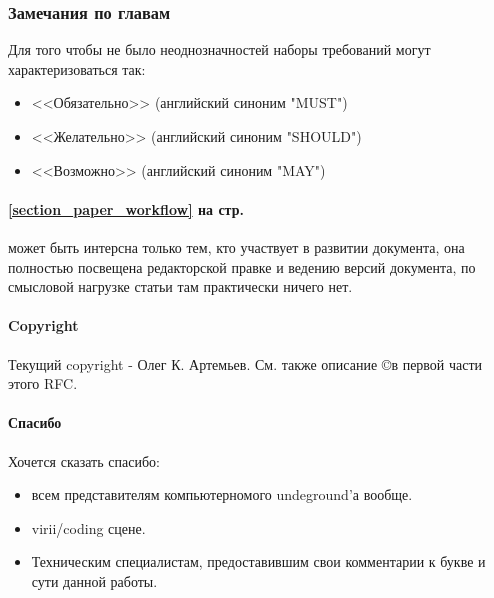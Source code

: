 \subsubsection{Замечания по главам}

Для того чтобы не было неоднозначностей наборы требований
могут характеризоваться так:

\begin{itemize}
\item{ <<Обязательно>> (английский синоним "MUST")}
\item{ <<Желательно>>  (английский синоним "SHOULD")}
\item{ <<Возможно>>    (английский синоним "MAY")}
\end{itemize}

\paragraph{\ref{section_paper_workflow} на стр. \pageref{section_paper_workflow}}
может быть интерсна только тем, кто участвует в развитии документа, она полностью
посвещена редакторской правке и ведению версий документа, по смысловой нагрузке
статьи там практически ничего нет.

\paragraph{Copyright\\}

Текущий copyright - Олег К. Артемьев. См. также описание \copyright в первой части этого RFC.

\paragraph{Спасибо\\}

Хочется сказать спасибо:

\begin{itemize}
\item{всем представителям компьютерномого undeground'а вообще.}
\item{virii/coding сцене.}
\item{Техническим специалистам, предоставившим свои комментарии
 к букве и сути данной работы.}
\end{itemize}
